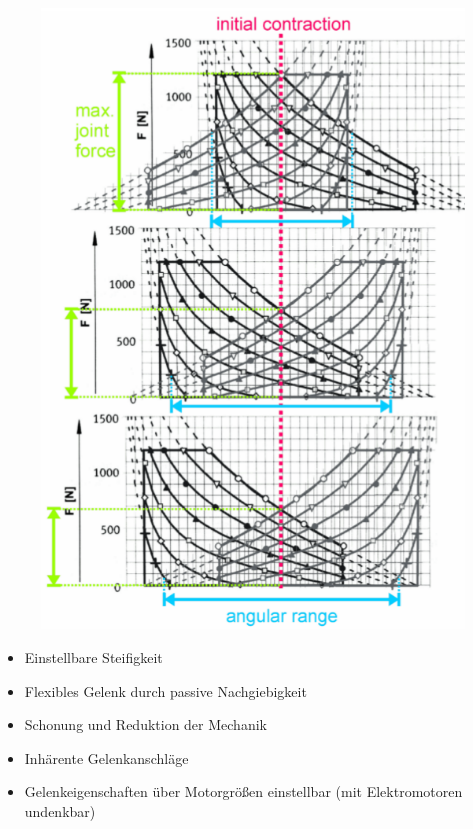 \begin{figure}[h!]
	\centering
	\includegraphics[width=0.4\linewidth]{figures/ch03_zwei-muskeln1.png}
	\caption{}
	\label{zm1}
\end{figure}
\begin{itemize}
	\item Einstellbare Steifigkeit
	\item Flexibles Gelenk durch passive Nachgiebigkeit
	\item Schonung und Reduktion der Mechanik
	\item Inhärente Gelenkanschläge
	\item Gelenkeigenschaften über Motorgrößen einstellbar (mit Elektromotoren undenkbar)
\end{itemize}
